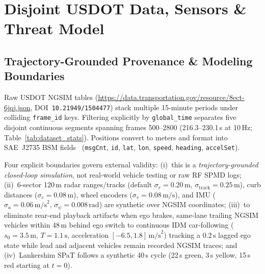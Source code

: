 \documentclass[journal]{IEEEtran}
\begin{document}
\section{Disjoint USDOT Data, Sensors \& Threat Model}

\subsection{Trajectory-Grounded Provenance \& Modeling Boundaries}
Raw USDOT NGSIM tables (\url{https://data.transportation.gov/resource/8ect-6jqj.json}, DOI~\texttt{10.21949/1504477}) stack multiple 15-minute periods under colliding \texttt{frame\_id} keys. Filtering explicitly by \texttt{global\_time} separates five disjoint continuous segments spanning frames 500--2800 (216.3--230.1\,s at 10\,Hz; Table~\ref{tab:dataset_stats}). Positions convert to meters and format into SAE~J2735 BSM fields~\cite{spmd} (\texttt{msgCnt}, \texttt{id}, \texttt{lat}, \texttt{lon}, \texttt{speed}, \texttt{heading}, \texttt{accelSet}).

Four explicit boundaries govern external validity: (i)~this is a \textit{trajectory-grounded closed-loop simulation}, not real-world vehicle testing or raw RF SPMD logs; (ii)~6-sector 120\,m radar ranges/tracks (default $\sigma_r=0.20\,\text{m}$, $\sigma_{\text{track}}=0.25\,\text{m}$), curb distances ($\sigma_c=0.08\,\text{m}$), wheel encoders ($\sigma_v=0.08\,\text{m/s}$), and IMU ($\sigma_a=0.06\,\text{m/s}^2$, $\sigma_\psi=0.008\,\text{rad}$) are synthetic over NGSIM coordinates; (iii)~to eliminate rear-end playback artifacts when ego brakes, same-lane trailing NGSIM vehicles within 48\,m behind ego switch to continuous IDM car-following ($s_0=3.5\,\text{m}$, $T=1.1\,\text{s}$, acceleration $[-6.5, 1.8]\,\text{m/s}^2$) tracking a $0.2\,\text{s}$ lagged ego state while lead and adjacent vehicles remain recorded NGSIM traces; and (iv)~Lankershim SPaT follows a synthetic 40\,s cycle (22\,s green, 3\,s yellow, 15\,s red starting at $t=0$).

\begin{table}[t]
\centering
\caption{Evaluated Multi-Minute Disjoint USDOT NGSIM Segments (Frames 500--2800, 10\,Hz)}
\label{tab:dataset_stats}
\scriptsize
\setlength{\tabcolsep}{1.8pt}
\end{table}
\end{document}
